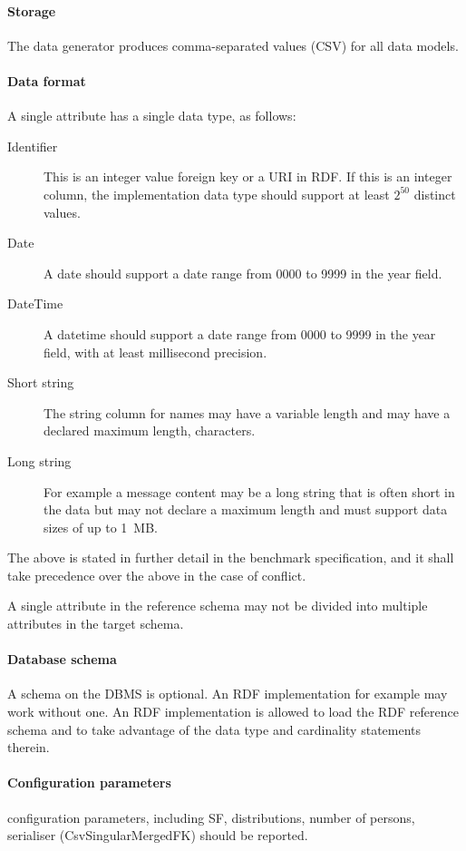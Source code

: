 \paragraph{Storage}
The data generator produces comma-separated values (CSV) for all data models.

\paragraph{Data format}
A single attribute has a single data type, as follows:
\begin{description}
    \item [Identifier] This is an integer value foreign key or a URI in RDF. If this is an integer column, the implementation data type should support at least $2^{50}$ distinct values.
    \item [Date] A date should support a date range from 0000 to 9999 in the year field.
    \item [DateTime] A datetime should support a date range from 0000 to 9999 in the year field, with at least millisecond precision.
    \item [Short string] The string column for names may have a variable length and may have a declared maximum length,  characters.
    \item [Long string] For example a message content may be a long string that is often short in the data but may not declare a maximum length and must support data sizes of up to 1~MB.
\end{description}

The above is stated in further detail in the benchmark specification, and it shall take precedence over the
above in the case of conflict.

A single attribute in the reference schema may not be divided into multiple attributes in the target schema.

\paragraph{Database schema}
A schema on the DBMS is optional. An RDF implementation for example may work without one. An RDF implementation is allowed to load the RDF reference schema and to take advantage of the data type and cardinality statements therein. 

\paragraph{Configuration parameters}
\datagen configuration parameters, including SF, distributions, number of persons, serialiser (\eg CsvSingularMergedFK) should be reported.


